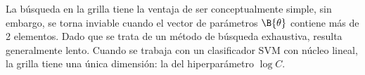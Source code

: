 La búsqueda en la grilla tiene la ventaja de ser conceptualmente
simple, sin embargo, se torna inviable cuando el vector de parámetros
$\B{\theta}$ contiene más de 2 elementos. Dado que se trata de un
método de búsqueda exhaustiva, resulta generalmente lento.  Cuando se
trabaja con un clasificador SVM con núcleo lineal, la grilla
tiene una única dimensión: la del hiperparámetro $\log C$.
